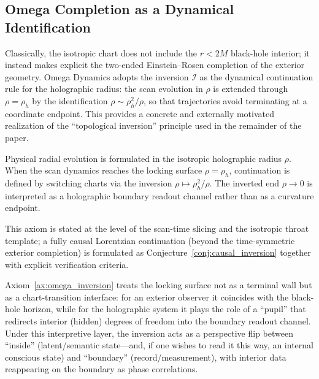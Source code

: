 \subsection{Omega Completion as a Dynamical Identification}
Classically, the isotropic chart does not include the $r<2M$ black-hole interior; it instead makes explicit the two-ended Einstein--Rosen completion of the exterior geometry. Omega Dynamics adopts the inversion $\mathcal{I}$ as the dynamical continuation rule for the holographic radius: the scan evolution in $\rho$ is extended through $\rho=\rho_h$ by the identification $\rho\sim\rho_h^2/\rho$, so that trajectories avoid terminating at a coordinate endpoint. This provides a concrete and externally motivated realization of the ``topological inversion'' principle used in the remainder of the paper.

\begin{axiom}
\label{ax:omega_inversion}
Physical radial evolution is formulated in the isotropic holographic radius $\rho$. When the scan dynamics reaches the locking surface $\rho=\rho_h$, continuation is defined by switching charts via the inversion $\rho\mapsto\rho_h^2/\rho$. The inverted end $\rho\to 0$ is interpreted as a holographic boundary readout channel rather than as a curvature endpoint.
\par
This axiom is stated at the level of the scan-time slicing and the isotropic throat template; a fully causal Lorentzian continuation (beyond the time-symmetric exterior completion) is formulated as Conjecture~\ref{conj:causal_inversion} together with explicit verification criteria.
\end{axiom}

\begin{remark}
Axiom~\ref{ax:omega_inversion} treats the locking surface not as a terminal wall but as a chart-transition interface: for an exterior observer it coincides with the black-hole horizon, while for the holographic system it plays the role of a ``pupil'' that redirects interior (hidden) degrees of freedom into the boundary readout channel. Under this interpretive layer, the inversion acts as a perspective flip between ``inside'' (latent/semantic state---and, if one wishes to read it this way, an internal conscious state) and ``boundary'' (record/measurement), with interior data reappearing on the boundary as phase correlations.
\end{remark}
